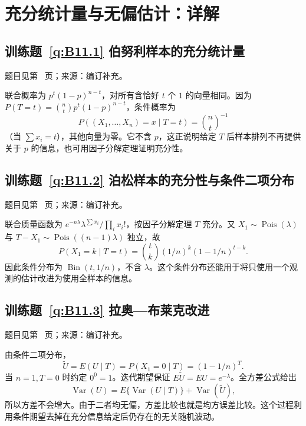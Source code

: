 \clearpage\section*{充分统计量与无偏估计：详解}

\subsection*{训练题~\ref{q:B11.1} 伯努利样本的充分统计量}\label{a:B11.1}{\small 题目见第~\pageref{q:B11.1} 页；来源：编订补充。}
\begin{solve}联合概率为 $p^t(1-p)^{n-t}$，对所有含恰好 $t$ 个 $1$ 的向量相同。因为 $P(T=t)=\binom nt p^t(1-p)^{n-t}$，条件概率为\[P((X_1,\ldots,X_n)=x\mid T=t)=\binom nt^{-1}\]（当 $\sum x_i=t$），其他向量为零。它不含 $p$，这正说明给定 $T$ 后样本排列不再提供关于 $p$ 的信息，也可用因子分解定理证明充分性。\end{solve}

\subsection*{训练题~\ref{q:B11.2} 泊松样本的充分性与条件二项分布}\label{a:B11.2}{\small 题目见第~\pageref{q:B11.2} 页；来源：编订补充。}
\begin{solve}联合质量函数为 $e^{-n\lambda}\lambda^{\sum x_i}/\prod_i x_i!$，按因子分解定理 $T$ 充分。又 $X_1\sim\operatorname{Pois}(\lambda)$ 与 $T-X_1\sim\operatorname{Pois}((n-1)\lambda)$ 独立，故\[P(X_1=k\mid T=t)=\binom tk(1/n)^k(1-1/n)^{t-k}.\]因此条件分布为 $\operatorname{Bin}(t,1/n)$，不含 $\lambda$。这个条件分布还能用于将只使用一个观测的估计改进为使用全样本的信息。\end{solve}

\subsection*{训练题~\ref{q:B11.3} 拉奥—布莱克改进}\label{a:B11.3}{\small 题目见第~\pageref{q:B11.3} 页；来源：编订补充。}
\begin{solve}由条件二项分布，\[\widetilde U=E(U\mid T)=P(X_1=0\mid T)=(1-1/n)^T.\]当 $n=1,T=0$ 时约定 $0^0=1$。迭代期望保证 $E\widetilde U=EU=e^{-\lambda}$。全方差公式给出\[\operatorname{Var}(U)=E\{\operatorname{Var}(U\mid T)\}+\operatorname{Var}(\widetilde U),\]所以方差不会增大。由于二者均无偏，方差比较也就是均方误差比较。这个过程利用条件期望去掉在充分信息给定后仍存在的无关随机波动。\end{solve}


